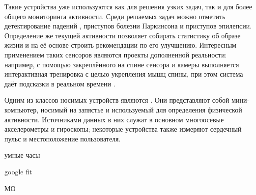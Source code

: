 Такие устройства уже используются как для решения узких задач, так и для более общего мониторинга активности. Среди решаемых задач можно отметить детектирование падений , приступов болезни Паркинсона  и приступов эпилепсии. Определение же текущей активности позволяет собирать статистику об образе жизни и на её основе строить рекомендации по его улучшению. Интересным применением таких сенсоров являются проекты дополненной реальности: например, с помощью закреплённого на спине сенсора и камеры выполняется интерактивная тренировка с целью укрепления мышц спины, при этом система даёт подсказки в реальном времени . 

Одним из классов носимых устройств являются . Они представляют собой мини-компьютер, носимый на запястье и используемый для определения физической активности. Источниками данных в них служат в основном многоосевые акселерометры и гироскопы; некоторые устройства также измеряют сердечный пульс и местоположение пользователя. 


умные часы


google fit


МО